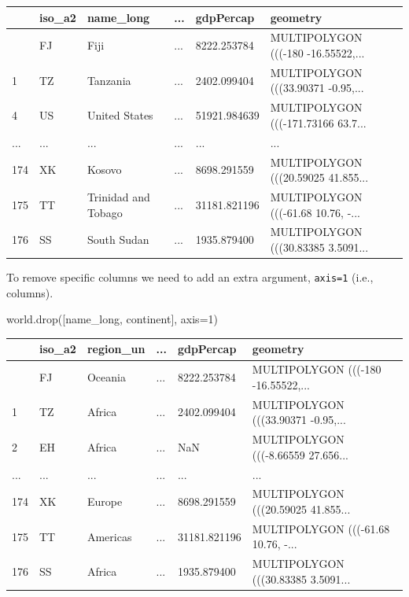 \documentclass[
  letterpaper,
]{krantz}
\newenvironment{Shaded}{\begin{snugshade}}{\end{snugshade}}
\newcommand{\DecValTok}[1]{\textcolor[rgb]{0.68,0.00,0.00}{#1}}
\newcommand{\NormalTok}[1]{\textcolor[rgb]{0.00,0.23,0.31}{#1}}
\newcommand{\OperatorTok}[1]{\textcolor[rgb]{0.37,0.37,0.37}{#1}}
\newcommand{\StringTok}[1]{\textcolor[rgb]{0.13,0.47,0.30}{#1}}
\begin{document}
\begin{longtable}[]{@{}llllll@{}}
\toprule\noalign{}
& iso\_a2 & name\_long & ... & gdpPercap & geometry \\
\midrule\noalign{}
\endhead
\bottomrule\noalign{}
\endlastfoot
0 & FJ & Fiji & ... & 8222.253784 & MULTIPOLYGON (((-180
-16.55522,... \\
1 & TZ & Tanzania & ... & 2402.099404 & MULTIPOLYGON (((33.90371
-0.95,... \\
4 & US & United States & ... & 51921.984639 & MULTIPOLYGON (((-171.73166
63.7... \\
... & ... & ... & ... & ... & ... \\
174 & XK & Kosovo & ... & 8698.291559 & MULTIPOLYGON (((20.59025
41.855... \\
175 & TT & Trinidad and Tobago & ... & 31181.821196 & MULTIPOLYGON
(((-61.68 10.76, -... \\
176 & SS & South Sudan & ... & 1935.879400 & MULTIPOLYGON (((30.83385
3.5091... \\
\end{longtable}

To remove specific columns we need to add an extra argument,
\texttt{axis=1} (i.e., columns).

\begin{Shaded}
\begin{Highlighting}[]
\NormalTok{world.drop([}\StringTok{\textquotesingle{}name\_long\textquotesingle{}}\NormalTok{, }\StringTok{\textquotesingle{}continent\textquotesingle{}}\NormalTok{], axis}\OperatorTok{=}\DecValTok{1}\NormalTok{)}
\end{Highlighting}
\end{Shaded}

\begin{longtable}[]{@{}llllll@{}}
\toprule\noalign{}
& iso\_a2 & region\_un & ... & gdpPercap & geometry \\
\midrule\noalign{}
\endhead
\bottomrule\noalign{}
\endlastfoot
0 & FJ & Oceania & ... & 8222.253784 & MULTIPOLYGON (((-180
-16.55522,... \\
1 & TZ & Africa & ... & 2402.099404 & MULTIPOLYGON (((33.90371
-0.95,... \\
2 & EH & Africa & ... & NaN & MULTIPOLYGON (((-8.66559 27.656... \\
... & ... & ... & ... & ... & ... \\
174 & XK & Europe & ... & 8698.291559 & MULTIPOLYGON (((20.59025
41.855... \\
175 & TT & Americas & ... & 31181.821196 & MULTIPOLYGON (((-61.68 10.76,
-... \\
176 & SS & Africa & ... & 1935.879400 & MULTIPOLYGON (((30.83385
3.5091... \\
\end{longtable}
\end{document}
